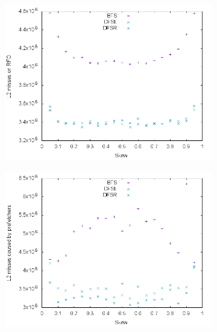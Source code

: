 \documentclass{article}
\begin{document}
\begin{figure}[H]
	\centering
	\begin{subfigure}[b]{0.49\textwidth}
		\includegraphics[width=\textwidth]{figures/combined_L2}	
	\end{subfigure}
	\begin{subfigure}[b]{0.49\textwidth}
		\includegraphics[width=\textwidth]{figures/combined_L2_PF}	
	\end{subfigure}
	\begin{subfigure}[b]{0.49\textwidth}

\end{subfigure}
\end{figure}
\end{document}
